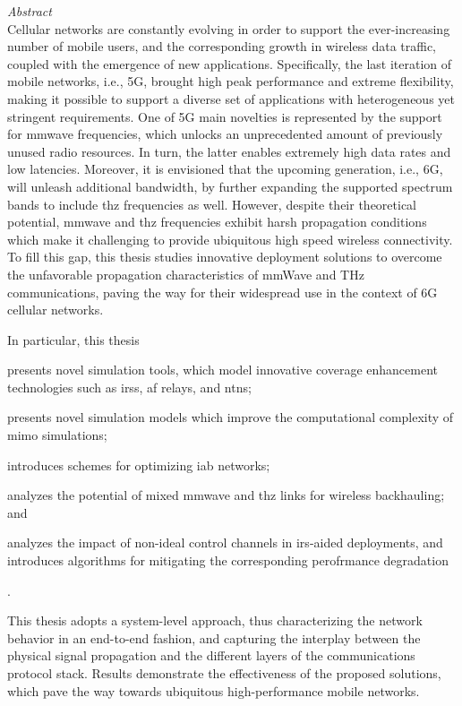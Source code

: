 {\noindent\huge\itshape Abstract}\\
%

Cellular networks are constantly evolving in order to support the ever-increasing number of mobile users, and the corresponding growth in wireless data traffic, coupled with the emergence of new applications. 
Specifically, the last iteration of mobile networks, i.e., 5G, brought high peak performance and extreme flexibility, making it possible to support a diverse set of applications with heterogeneous yet stringent requirements. 
One of 5G main novelties is represented by the support for \gls{mmwave} frequencies, which unlocks an unprecedented amount of previously unused radio resources. In turn, the latter enables extremely high data rates and low latencies. Moreover, it is envisioned that the upcoming generation, i.e., 6G, will unleash additional bandwidth, by further expanding the supported spectrum bands to include \gls{thz} frequencies as well. 
However, despite their theoretical potential, \gls{mmwave} and \gls{thz} frequencies exhibit harsh propagation conditions which make it challenging to provide ubiquitous high speed wireless connectivity. 
To fill this gap, this thesis studies innovative deployment solutions to overcome the unfavorable propagation characteristics of mmWave and THz communications, paving the way for their widespread use in the context of 6G cellular networks. 

In particular, this thesis
\begin{enumerate*}[label=(\roman*)]
    \item presents novel simulation tools, which model innovative coverage enhancement technologies such as \glspl{irs}, \gls{af} relays, and \glspl{ntn};
    \item presents novel simulation models which improve the computational complexity of \gls{mimo} simulations;
    \item introduces schemes for optimizing \gls{iab} networks;
    \item analyzes the potential of mixed \gls{mmwave} and \gls{thz} links for wireless backhauling; and
    \item analyzes the impact of non-ideal control channels in \gls{irs}-aided deployments, and introduces algorithms for mitigating the corresponding perofrmance degradation
\end{enumerate*}.

This thesis adopts a system-level approach, thus characterizing the network behavior in an end-to-end fashion, and capturing the interplay between the physical signal propagation and the different layers of the communications protocol stack. Results demonstrate the effectiveness of the proposed solutions, which pave the way towards ubiquitous high-performance mobile networks.

